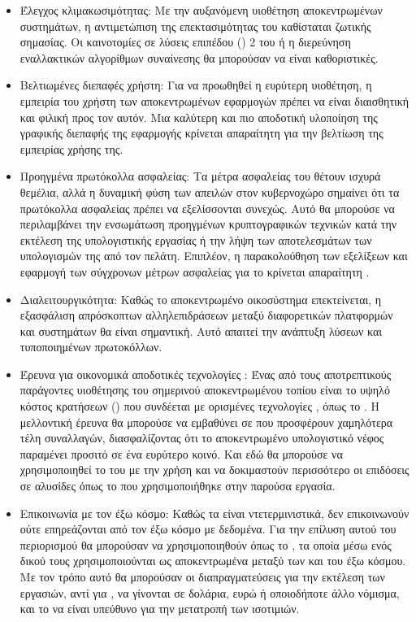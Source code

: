 \begin{itemize}
\item Έλεγχος κλιμακωσιμότητας: Με την αυξανόμενη υιοθέτηση αποκεντρωμένων συστημάτων, η αντιμετώπιση της επεκτασιμότητας του  καθίσταται ζωτικής σημασίας. Οι καινοτομίες σε λύσεις επιπέδου () 2 του  \cite{ref24} ή η διερεύνηση εναλλακτικών αλγορίθμων συναίνεσης θα μπορούσαν να είναι καθοριστικές.
\item Βελτιωμένες διεπαφές χρήστη: Για να προωθηθεί η ευρύτερη υιοθέτηση, η εμπειρία του χρήστη των αποκεντρωμένων εφαρμογών πρέπει να είναι διαισθητική και φιλική προς τον αυτόν. Μια καλύτερη και πιο αποδοτική υλοποίηση της γραφικής διεπαφής της εφαρμογής κρίνεται απαραίτητη για την βελτίωση της εμπειρίας χρήσης της.
\item Προηγμένα πρωτόκολλα ασφαλείας: Τα μέτρα ασφαλείας του  θέτουν ισχυρά θεμέλια, αλλά η δυναμική φύση των απειλών στον κυβερνοχώρο σημαίνει ότι τα πρωτόκολλα ασφαλείας πρέπει να εξελίσσονται συνεχώς. Αυτό θα μπορούσε να περιλαμβάνει την ενσωμάτωση προηγμένων κρυπτογραφικών τεχνικών κατά την εκτέλεση της υπολογιστικής εργασίας ή την λήψη των αποτελεσμάτων των υπολογισμών της από τον πελάτη. Επιπλέον, η παρακολούθηση των εξελίξεων και εφαρμογή των σύγχρονων μέτρων ασφαλείας για το  κρίνεται απαραίτητη \cite{ref46,ref47}.
\item Διαλειτουργικότητα: Καθώς το αποκεντρωμένο οικοσύστημα επεκτείνεται, η εξασφάλιση απρόσκοπτων αλληλεπιδράσεων μεταξύ διαφορετικών πλατφορμών και συστημάτων  θα είναι σημαντική. Αυτό απαιτεί την ανάπτυξη λύσεων  και τυποποιημένων πρωτοκόλλων.
\item Έρευνα για οικονομικά αποδοτικές τεχνολογίες : Ένας από τους αποτρεπτικούς παράγοντες υιοθέτησης του σημερινού αποκεντρωμένου τοπίου είναι το υψηλό κόστος κρατήσεων ()  που συνδέεται με ορισμένες τεχνολογίες , όπως το . Η μελλοντική έρευνα θα μπορούσε να εμβαθύνει σε  που προσφέρουν χαμηλότερα τέλη συναλλαγών, διασφαλίζοντας ότι το αποκεντρωμένο υπολογιστικό νέφος παραμένει προσιτό σε ένα ευρύτερο κοινό. Και εδώ θα μπορούσε να χρησιμοποιηθεί το  του  με την χρήση  \cite{ref24} και να δοκιμαστούν περισσότερο οι επιδόσεις σε αλυσίδες όπως το  που χρησιμοποιήθηκε στην παρούσα εργασία.
\item Επικοινωνία με τον έξω κόσμο: Καθώς τα  είναι ντετερμινιστικά, δεν επικοινωνούν ούτε επηρεάζονται από τον έξω κόσμο με  δεδομένα. Για την επίλυση αυτού του περιορισμού θα μπορούσαν να χρησιμοποιηθούν  όπως το  \cite{ref48}, τα οποία μέσω ενός δικού τους  χρησιμοποιούνται ως αποκεντρωμένα  μεταξύ των  και του έξω κόσμου. Με τον τρόπο αυτό θα μπορούσαν οι διαπραγματεύσεις για την εκτέλεση των εργασιών, αντί για , να γίνονται σε δολάρια, ευρώ ή οποιοδήποτε άλλο νόμισμα, και το  να είναι υπεύθυνο για την μετατροπή των ισοτιμιών.

\end{itemize}
